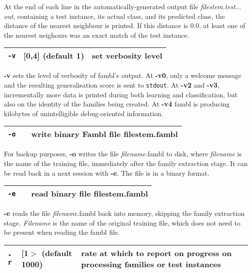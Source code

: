 \documentclass[11pt]{article}
\begin{document}
At the end of each line in the automatically-generated output file
{\sl filestem.test$\ldots$out}, containing a test instance, its actual
class, and its predicted class, the distance of the nearest neighbour
is printed. If this distance is $0.0$, at least one of the nearest
neighours was an exact match of the test instance.
\ \\

\begin{tabular}{|p{}|p{}|p{}|}
\hline
{\tt -v} & [0,4] (default 1) & set verbosity level \\
\hline
\end{tabular}

{\bf -v} sets the level of verbosity of {\sc fambl}'s output. At {\bf
  -v0}, only a welcome message and the resulting generalisation score
is sent to {\tt stdout}. At {\bf -v2} and {\bf -v3}, incrementally
more data is printed during both learning and classification, but also
on the identity of the families being created. At {\bf -v4} {\sc
  fambl} is producing kilobytes of unintelligible debug-oriented
information.  \ \\

\begin{tabular}{|p{}|p{}|p{}|}
\hline
{\tt -o} & & write binary Fambl file filestem.fambl \\
\hline
\end{tabular}

For backup purposes, {\bf -o} writes the file {\sl filename}.fambl to
disk, where {\sl filename} is the name of the training file,
immediately after the family extraction stage. It can be read back in
a next session with {\bf -e}. The file is in a binary format.  \ \\

\begin{tabular}{|p{}|p{}|p{}|}
\hline
{\tt -e} & & read binary file filestem.fambl \\
\hline
\end{tabular}

{\bf -e} reads the file {\sl filename}.fambl back into memory,
skipping the family extraction stage. {\sl Filename} is the name of
the original training file, which does not need to be present when
reading the {\sc fambl} file.  \ \\

\begin{tabular}{|p{}|p{}|p{}|}
\hline
{\tt -r} & [1$>$ (default 1000) & rate at which to report on progress on 
processing families or test instances \\
\hline
\end{tabular}
\end{document}
